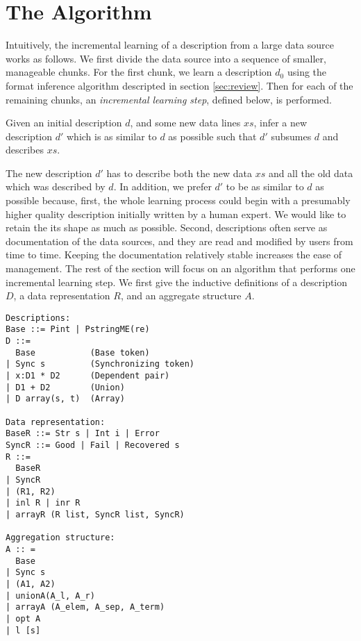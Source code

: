 \section{The Algorithm}
\label{sec:algo}
Intuitively, the incremental learning of a description from a large data source works
as follows. We first divide the data source into a sequence of smaller, manageable chunks.
For the first chunk, we learn a description $d_0$ using the format inference
algorithm descripted in section \ref{sec:review}. Then for each of the remaining chunks,
an {\em incremental learning step}, defined below, is performed.  

\begin{definition}
Given an initial description $d$, and some new data lines $xs$, infer a new description $d'$ 
which is as similar to $d$ as possible such that $d'$ subsumes $d$ and describes $xs$.
\end{definition}

The new description $d'$ has to describe both the new data $xs$ and
all the old data which was described by $d$. 
In addition, we prefer $d'$ to be as similar to $d$ as possible because, 
first, the whole learning process could begin with a presumably higher quality description 
initially written by a human expert. We would like to retain the its shape as much as possible.
Second, descriptions often serve as documentation of the data sources, and they are
read and modified by users from time to time. Keeping the documentation relatively stable increases
the ease of management. The rest of the section will focus on an algorithm that
performs one incremental learning step.
We first give the inductive definitions of
a description $D$, a data representation $R$, and an aggregate structure $A$. 

{\small 
\begin{verbatim}
Descriptions:
Base ::= Pint | PstringME(re)
D ::=   
  Base           (Base token)
| Sync s         (Synchronizing token) 
| x:D1 * D2      (Dependent pair)
| D1 + D2        (Union)
| D array(s, t)  (Array)

Data representation:
BaseR ::= Str s | Int i | Error
SyncR ::= Good | Fail | Recovered s 
R ::=
  BaseR
| SyncR
| (R1, R2)
| inl R | inr R
| arrayR (R list, SyncR list, SyncR)

Aggregation structure:
A :: = 
  Base
| Sync s
| (A1, A2)
| unionA(A_l, A_r)
| arrayA (A_elem, A_sep, A_term)
| opt A
| l [s]
\end{verbatim}
}

